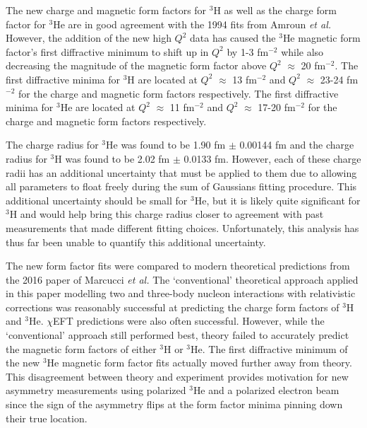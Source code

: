 \documentclass[../main.tex]{subfiles}
\begin{document}
\begin{singlespace}
{{}

{\parindent0pt %

\indent The new charge and magnetic form factors for $^3$H as well as the charge form factor for $^3$He are in good agreement with the 1994 fits from Amroun \textit{et al.} However, the addition of the new high $Q^2$ data has caused the $^3$He magnetic form factor's first diffractive minimum to shift up in $Q^2$ by 1-3 fm$^{-2}$ while also decreasing the magnitude of the magnetic form factor above $Q^2$ $\approx$ 20 fm$^{-2}$. The first diffractive minima for $^3$H are located at $Q^2$ $\approx$ 13 fm$^{-2}$ and $Q^2$ $\approx$ 23-24 fm$^{-2}$ for the charge and magnetic form factors respectively. The first diffractive minima for $^3$He are located at $Q^2$ $\approx$ 11 fm$^{-2}$ and $Q^2$ $\approx$ 17-20 fm$^{-2}$ for the charge and magnetic form factors respectively. \\

}

{\parindent0pt %

\indent The charge radius for $^3$He was found to be 1.90 fm $\pm$ 0.00144 fm and the charge radius for $^3$H was found to be 2.02 fm $\pm$ 0.0133 fm. However, each of these charge radii has an additional uncertainty that must be applied to them due to allowing all parameters to float freely during the sum of Gaussians fitting procedure. This additional uncertainty should be small for $^3$He, but it is likely quite significant for $^3$H and would help bring this charge radius closer to agreement with past measurements that made different fitting choices. Unfortunately, this analysis has thus far been unable to quantify this additional uncertainty. \\

}

{\parindent0pt %

\indent The new form factor fits were compared to modern theoretical predictions from the 2016 paper of Marcucci \textit{et al.} The `conventional' theoretical approach applied in this paper modelling two and three-body nucleon interactions with relativistic corrections was reasonably successful at predicting the charge form factors of $^3$H and $^3$He. $\chi$EFT predictions were also often successful. However, while the `conventional' approach still performed best, theory failed to accurately predict the magnetic form factors of either $^3$H or $^3$He. The first diffractive minimum of the new $^3$He magnetic form factor fits actually moved further away from theory. This disagreement between theory and experiment provides motivation for new asymmetry measurements using polarized $^3$He and a polarized electron beam since the sign of the asymmetry flips at the form factor minima pinning down their true location.

}

}
\end{singlespace}
\end{document}
